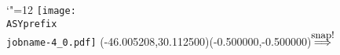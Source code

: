 \setlength{\unitlength}{1pt}
\makeatletter%
\let\ASYencoding\f@encoding%
\let\ASYfamily\f@family%
\let\ASYseries\f@series%
\let\ASYshape\f@shape%
\makeatother%
{\catcode`"=12%
\texttt{[image: \\ASYprefix\\jobname-4\_0.pdf]}%
}%
\color{ASYcolor}
\fontsize{12.000000}{14.400000}\selectfont
\usefont{\ASYencoding}{\ASYfamily}{\ASYseries}{\ASYshape}%
\ASYalign(-46.005208,30.112500)(-0.500000,-0.500000){$\stackrel{\mbox{\small snap!}}{\Longrightarrow}$}%

